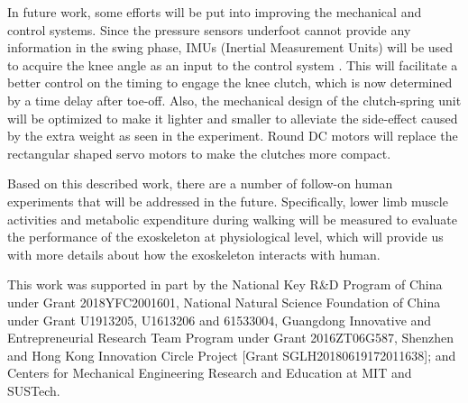 \documentclass[10pt]{asme2ej}
\begin{document}
In future work, some efforts will be put into improving the mechanical and control systems.
Since the pressure sensors underfoot cannot provide any information in the swing phase, IMUs (Inertial Measurement Units) will be used to acquire the knee angle as an input to the control system \cite{IMU2,hao2019smoother}.
This will facilitate a better control on the timing to engage the knee clutch, which is now determined by a time delay after toe-off.
Also, the mechanical design of the clutch-spring unit will be optimized to make it lighter and smaller to alleviate the side-effect caused by the extra weight as seen in the experiment.
Round DC motors will replace the rectangular shaped servo motors to make the clutches more compact. 

Based on this described work, there are a number of follow-on human experiments that will be addressed in the future.
Specifically, lower limb muscle activities and metabolic expenditure during walking will be measured to evaluate the performance of the exoskeleton at physiological level, which will provide us with more details about how the exoskeleton interacts with human.

\begin{acknowledgment}
This work was supported in part by the National Key R\&D Program of China under Grant 2018YFC2001601, National Natural Science Foundation of China under Grant U1913205, U1613206 and 61533004, Guangdong Innovative and Entrepreneurial Research Team Program under Grant 2016ZT06G587, Shenzhen and Hong Kong Innovation Circle Project [Grant SGLH20180619172011638]; and Centers for Mechanical Engineering Research and Education at MIT and SUSTech.
\end{acknowledgment}


%


\end{document}
